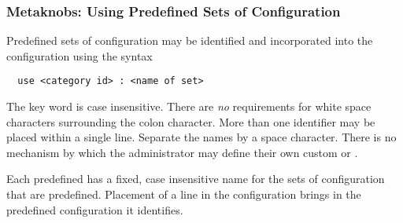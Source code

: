 \subsubsection{\label{sec:Config-Metaknobs}Metaknobs: Using Predefined Sets of Configuration}
Predefined sets of configuration may be identified and incorporated
into the configuration using the syntax
\begin{verbatim}
  use <category id> : <name of set> 
\end{verbatim}

The  key word is case insensitive.
There are \emph{no} requirements for white space characters surrounding
the colon character.
More than one  identifier may be placed within
a single  line. 
Separate the names by a space character. 
There is no mechanism by which the administrator may define their
own custom  or .

Each predefined  has a fixed, case insensitive
name for the sets of configuration that are predefined. 
Placement of a  line in the configuration brings in
the predefined configuration it identifies.

